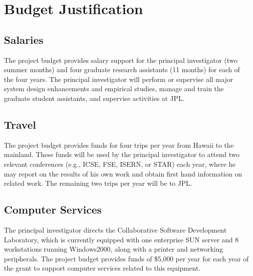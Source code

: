 
\pagestyle{empty}
\section*{Budget Justification}

\subsection*{Salaries}

The project budget provides salary support for the principal investigator
(two summer months) and four graduate research
assistants (11 months) for each of the four years.  The principal
investigator will perform or supervise all major system design enhancements
and empirical studies, manage and train the graduate student
assistants, and supervise activities at JPL.

\subsection*{Travel}

The project budget provides funds for four trips per year from Hawaii to the
mainland.  These funds will be used by the principal investigator to attend
two relevant conferences (e.g., ICSE, FSE, ISERN, or STAR) each year, where
he may report on the results of his own work and obtain first hand
information on related work. The remaining two trips per year will be to JPL. 

\subsection*{Computer Services}

The principal investigator directs the Collaborative Software Development
Laboratory, which is currently equipped with one enterprise SUN server and 8
workstations running Windows2000, along with a printer and 
networking peripherals.  The project budget provides funds of \$5,000
per year for each year of the grant to support computer services related
to this equipment.

